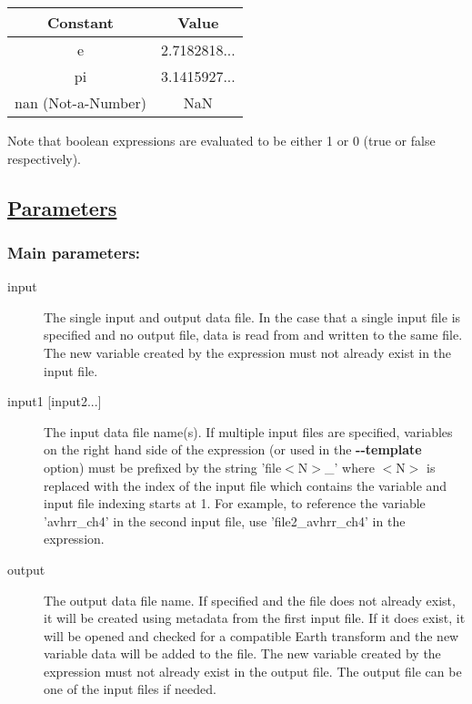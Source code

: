  

\begin{tabular}{|c|c|}
\hline 
Constant &Value \\
 \hline 
e &2.7182818... \\
 \hline 
pi &3.1415927... \\
 \hline 
nan (Not-a-Number) &NaN \\
 \hline 

\end{tabular}




 Note that boolean expressions are evaluated to be either 1 or 0 (true or false respectively). 
\subsection*{\underline{Parameters}}
\subsubsection*{Main parameters:}
\begin{description}
\item[input]The single input and output data file. In the case that a single input file is specified and no output file, data is read from and written to the same file. The new variable created by the expression must not already exist in the input file.
\item[input1 [input2...{]}]The input data file name(s). If multiple input files are specified, variables on the right hand side of the expression (or used in the \textbf{-{-}template}
 option) must be prefixed by the string 'file$<$N$>$\_' where $<$N$>$ is replaced with the index of the input file which contains the variable and input file indexing starts at 1. For example, to reference the variable 'avhrr\_ch4' in the second input file, use 'file2\_avhrr\_ch4' in the expression.
\item[output]The output data file name. If specified and the file does not already exist, it will be created using metadata from the first input file. If it does exist, it will be opened and checked for a compatible Earth transform and the new variable data will be added to the file. The new variable created by the expression must not already exist in the output file. The output file can be one of the input files if needed.

\end{description}
